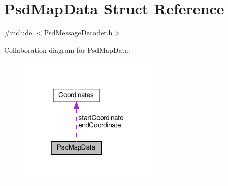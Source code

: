 \hypertarget{struct_psd_map_data}{}\section{Psd\+Map\+Data Struct Reference}
\label{struct_psd_map_data}


{\ttfamily \#include $<$Psd\+Message\+Decoder.\+h$>$}



Collaboration diagram for Psd\+Map\+Data\+:\nopagebreak
\begin{figure}[H]
\begin{center}
\leavevmode
\includegraphics[width=187pt]{struct_psd_map_data__coll__graph}
\end{center}
\end{figure}
